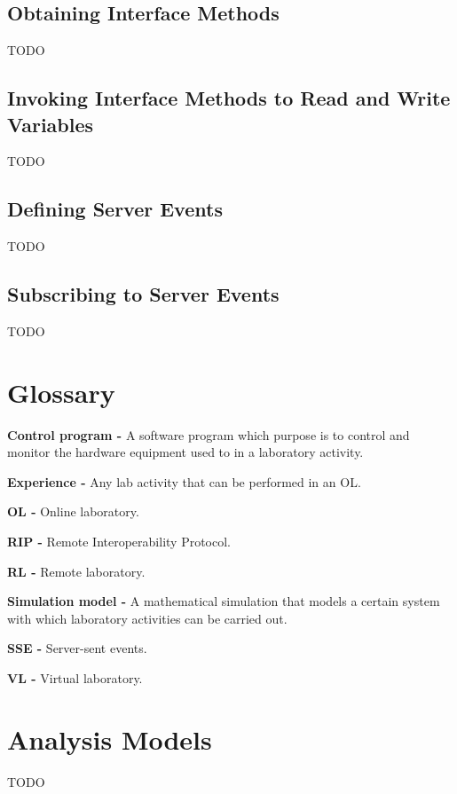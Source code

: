 \section{Obtaining Interface Methods}
TODO

\section{Invoking Interface Methods to Read and Write Variables}
TODO

\section{Defining Server Events}
TODO

\section{Subscribing to Server Events}
TODO


\begin{appendices}

\chapter{Glossary}
\textbf{Control program -} A software program which purpose is to control and monitor the hardware equipment used to in a laboratory activity.

\textbf{Experience -} Any lab activity that can be performed in an OL.

\textbf{OL -} Online laboratory.

\textbf{RIP -} Remote Interoperability Protocol.

\textbf{RL -} Remote laboratory.

\textbf{Simulation model -} A mathematical simulation that models a certain system with which laboratory activities can be carried out.

\textbf{SSE -} Server-sent events.

\textbf{VL -} Virtual laboratory.


\chapter{Analysis Models}
TODO

\end{appendices}


\renewcommand\bibname{References}

